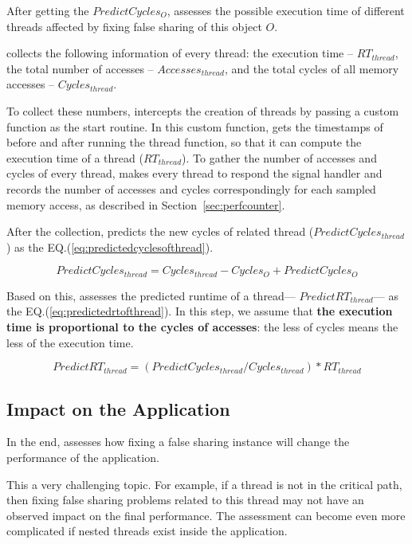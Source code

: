 After getting the $PredictCycles_{O}$, \cheetah{} assesses the possible execution time of different threads affected by fixing false sharing of this object $O$. 

\Cheetah{} collects the following information of every thread: the execution time -- $RT_{thread}$, the total number of accesses -- $Accesses_{thread}$, and the total cycles of all memory accesses -- $Cycles_{thread}$.

To collect these numbers, \cheetah{} intercepts the creation of threads by passing a custom function as the start routine. In this custom function, \cheetah{} gets the timestamps of before and after running the thread function, so that it can compute the execution time of a thread ($RT_{thread}$). To gather the number of accesses and cycles of every thread, \cheetah{} makes every thread to respond the signal handler and records the number of accesses and cycles correspondingly  for each sampled memory access, as described in Section~\ref{sec:perfcounter}. 

After the collection, \cheetah{} predicts the new cycles of related thread ($PredictCycles_{thread}$) as the EQ.(\ref{eq:predictedcyclesofthread}).

\begin{equation}
\label{eq:predictedcyclesofthread}
 PredictCycles_{thread} = Cycles_{thread} - Cycles_{O} + PredictCycles_{O} 
\end{equation} 
 

Based on this, \cheetah{} assesses the predicted runtime of a thread--- $PredictRT_{thread}$--- as the EQ.(\ref{eq:predictedrtofthread}). In this step, we assume that {\bf the execution time is proportional to the cycles of accesses}: the less of cycles means the less of the execution time.  

\begin{equation}
\label{eq:predictedrtofthread}
 PredictRT_{thread} = (PredictCycles_{thread}/Cycles_{thread}) * RT_{thread} 
\end{equation} 

\subsection{Impact on the Application}
\label{sec:impactapp}

In the end, \cheetah{} assesses how fixing a false sharing instance will change the performance of the application. 

This a very challenging topic. For example, if a thread is not in the critical path, then fixing false sharing problems related to this thread may not have an observed impact on the final performance. The assessment can become even more complicated if nested threads exist inside the application. 

